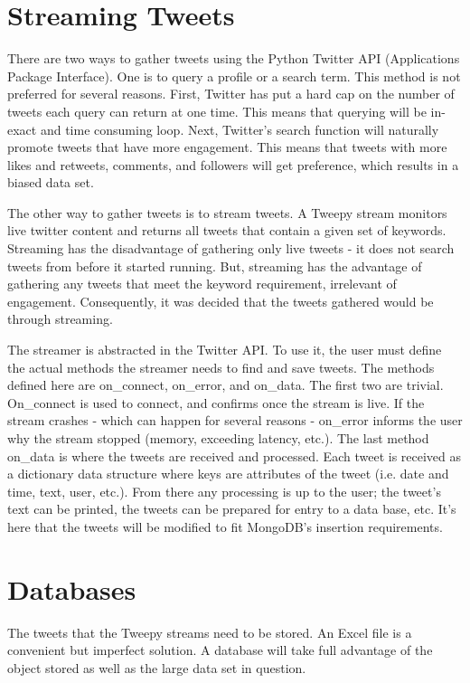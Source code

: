 \documentclass[11pt, twoside, reqno]{book}
\begin{document}
\section{Streaming Tweets}
\hspace{0.2in} There are two ways to gather tweets using the Python Twitter API (Applications Package Interface). One is to query a profile or a search term. This method is not preferred for several reasons. First, Twitter has put a hard cap on the number of tweets each query can return at one time. This means that querying will be in-exact and time consuming loop. Next, Twitter's search function will naturally promote tweets that have more engagement. This means that tweets with more likes and retweets, comments, and followers will get preference, which results in a biased data set. 

The other way to gather tweets is to stream tweets. A Tweepy stream monitors live twitter content and returns all tweets that contain a given set of keywords. Streaming has the disadvantage of gathering only live tweets - it does not search tweets from before it started running. But, streaming has the advantage of gathering any tweets that meet the keyword requirement, irrelevant of engagement. Consequently, it was decided that the tweets gathered would be through streaming. 

The streamer is abstracted in the Twitter API. To use it, the user must define the actual methods the streamer needs to find and save tweets. The methods defined here are on\_connect, on\_error, and on\_data. The first two are trivial. On\_connect is used to connect, and confirms once the stream is live. If the stream crashes - which can happen for several reasons - on\_error informs the user why the stream stopped (memory, exceeding latency, etc.). The last method on\_data is where the tweets are received and processed. Each tweet is received as a dictionary data structure where keys are attributes of the tweet (i.e. date and time, text, user, etc.). From there any processing is up to the user; the tweet's text can be printed, the tweets can be prepared for entry to a data base, etc. It's here that the tweets will be modified to fit MongoDB's insertion requirements. 

\section{Databases}
\hspace{0.2in} The tweets that the Tweepy streams need to be stored. An Excel file is a convenient but imperfect solution. A database will take full advantage of the object stored as well as the large data set in question. 
\end{document}
